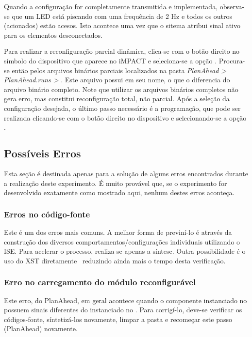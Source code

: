 \documentclass[11pt,a4paper,oneside]{book}
\begin{document}
Quando a configuração for completamente transmitida e implementada, observa-se que um LED está piscando com uma frequência de 2 Hz e todos os outros (acionados) estão acesos.
Isto acontece uma vez que o sitema atribui sinal ativo para os elementos desconectados.

Para realizar a reconfiguração parcial dinâmica, clica-se com o botão direito no símbolo do dispositivo que aparece no iMPACT e seleciona-se a opção .
Procura-se então pelos arquivos binários parciais localizados na pasta \textit{PlanAhead > PlanAhead.runs >} .
Este arquivo possui  em seu nome, o que o diferencia do arquivo binário completo.
Note que utilizar os arquivos binários completos não gera erro, mas constitui reconfiguração total, não parcial.
Após a seleção da configuração desejada, o último passo necessário é a programação, que pode ser realizada clicando-se com o botão direito no dispositivo e selecionando-se a opção .

\subsection{Possíveis Erros}
Esta seção é destinada apenas para a solução de alguns erros encontrados durante a realização deste experimento.
É muito provável que, se o experimento for desenvolvido exatamente como mostrado aqui, nenhum destes erros aconteça.

\subsubsection{Erros no código-fonte} Este é um dos erros mais comuns.
A melhor forma de previní-lo é através da construção dos diversos comportamentos/configurações individuais utilizando o ISE.
Para acelerar o processo, realiza-se apenas a síntese.
Outra possibilidade é o uso do XST diretamente \, reduzindo ainda mais o tempo desta verificação. 

\subsubsection{Erro no carregamento do módulo reconfigurável}
Este erro, do PlanAhead, em geral acontece quando o componente instanciado no  possuem sinais diferentes do instanciado no .
Para corrigí-lo, deve-se verificar os códigos-fonte, síntetizá-los novamente, limpar a pasta  e recomeçar este passo (PlanAhead) novamente.
\end{document}
